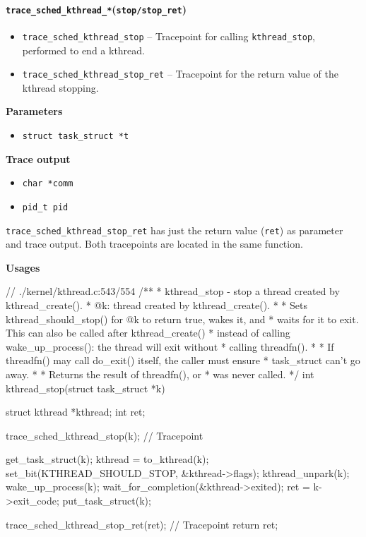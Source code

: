 \paragraph{\texttt{trace\_sched\_kthread\_*}(\texttt{stop/stop\_ret})}
\begin{itemize}
    \item \texttt{trace\_sched\_kthread\_stop} -- Tracepoint for calling \verb|kthread_stop|, performed to end a kthread.
    \item \texttt{trace\_sched\_kthread\_stop\_ret} -- Tracepoint for the return value of the kthread stopping.
\end{itemize}

\textbf{Parameters}
\begin{itemize}
    \item \verb|struct task_struct *t|
\end{itemize}

\textbf{Trace output}
\begin{itemize}
    \item \verb|char *comm|
    \item \verb|pid_t pid|
\end{itemize}

\texttt{trace\_sched\_kthread\_stop\_ret} has just the return value (\verb|ret|) as parameter and trace output. Both tracepoints are located in the same function.

\textbf{Usages}
\begin{code}
// ./kernel/kthread.c:543/554
/**
 * kthread_stop - stop a thread created by kthread_create().
 * @k: thread created by kthread_create().
 *
 * Sets kthread_should_stop() for @k to return true, wakes it, and
 * waits for it to exit. This can also be called after kthread_create()
 * instead of calling wake_up_process(): the thread will exit without
 * calling threadfn().
 *
 * If threadfn() may call do_exit() itself, the caller must ensure
 * task_struct can't go away.
 *
 * Returns the result of threadfn(), or %
 * was never called.
 */
int kthread_stop(struct task_struct *k){
	struct kthread *kthread;
	int ret;

	trace_sched_kthread_stop(k); // Tracepoint

	get_task_struct(k);
	kthread = to_kthread(k);
	set_bit(KTHREAD_SHOULD_STOP, &kthread->flags);
	kthread_unpark(k);
	wake_up_process(k);
	wait_for_completion(&kthread->exited);
	ret = k->exit_code;
	put_task_struct(k);

	trace_sched_kthread_stop_ret(ret); // Tracepoint
	return ret;
}
\end{code}